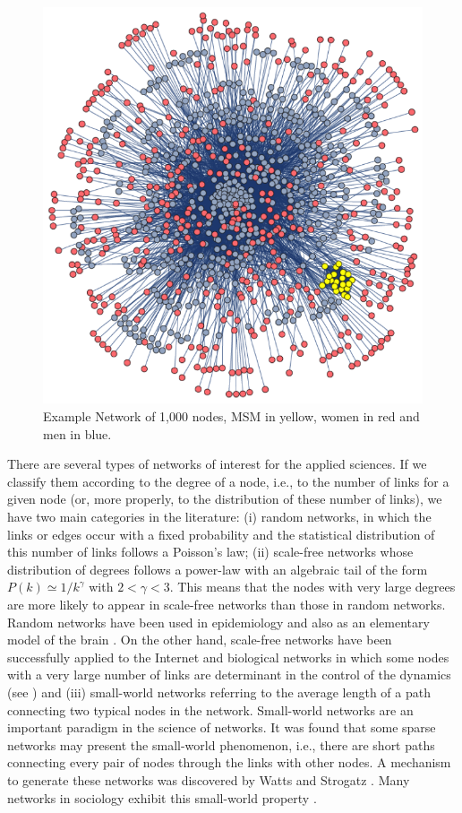 \begin{figure}[ht]
	\centering
	\includegraphics[scale=0.7]{IMG/LSPasd.png}
	\caption{Example Network of 1,000 nodes, MSM in yellow, women in red and men in blue.}
	\label{LSPnetwork}
\end{figure}


There are several types of networks of interest for the applied sciences. If we classify them according to the degree of a node, i.e., to the number of links for a given node (or, more properly, to the distribution of these number of links), we have two main categories in the literature: (i) random networks, in which the links or edges occur with a fixed probability and the statistical distribution of this number of links follows a Poisson's law; (ii) scale-free networks whose distribution of degrees follows a power-law with an algebraic tail of the form $P(k) \simeq 1/k^\gamma$ with $2 < \gamma < 3$. This means that the nodes with very large degrees are more likely to appear in scale-free networks than those in random networks. Random networks have been used in epidemiology \cite{acedo2011using} and also as an elementary model of the brain \cite{acedo2013brain}. On the other hand, scale-free networks have been successfully applied to the Internet and biological networks in which some nodes with a very large number of links are determinant in the control of the dynamics (see \cite{dorogovtsev2013evolution}) and (iii) small-world networks referring to the average length of a path connecting two typical nodes in the network. Small-world networks are an important paradigm in the science of networks. It was found that some sparse networks may present the small-world phenomenon, i.e., there are short paths connecting every pair of nodes through the links with other nodes. A mechanism to generate these networks was discovered by Watts and Strogatz \cite{watts1998collective}. Many networks in sociology exhibit this small-world property \cite{christakis2007spread,liljeros2001web,bearman2004chains}.

